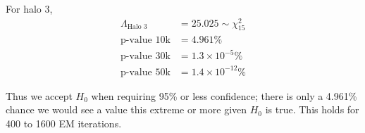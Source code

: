 \documentclass[12pt]{amsart}
\newcommand{\eqn}[1]{\begin{align*}
#1
\end{align*}}
\begin{document}
For halo 3,
\eqn{
	\Lambda_\text{Halo 3} &= 25.025 \sim \chi^2_{15}	\\
	\text{p-value 10k} &= 4.961\%\\
	\text{p-value 30k} &= 1.3\times 10^{-5}\%\\
	\text{p-value 50k} &= 1.4\times 10^{-12}\%
}

Thus we accept $H_0$ when requiring 95\% or less confidence; there is only a 4.961\% chance we would see a value this extreme or more given $H_0$ is true. This holds for 400 to 1600 EM iterations.
\end{document}
